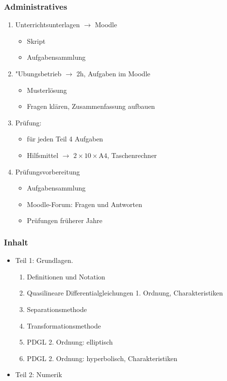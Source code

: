%
%
%
\begin{frame}
\frametitle{Administratives}
\begin{enumerate}
\item Unterrichtsunterlagen $\to$ Moodle
\begin{itemize}
\item Skript
\item Aufgabensammlung
\end{itemize}
\item "Ubungsbetrieb $\to$ 2h, Aufgaben im Moodle
\begin{itemize}
\item Musterlösung
\item Fragen klären, Zusammenfassung aufbauen
\end{itemize}
\item Prüfung:
\begin{itemize}
\item für jeden Teil 4 Aufgaben
\item Hilfsmittel $\to$ $2\times 10\times \text{A4}$, Taschenrechner
\end{itemize}
\item Prüfungsvorbereitung
\begin{itemize}
\item Aufgabensammlung
\item Moodle-Forum: Fragen und Antworten
\item Prüfungen früherer Jahre
\end{itemize}
\end{enumerate}
\end{frame}

\begin{frame}
\frametitle{Inhalt}
\begin{itemize}[<+->]
\item Teil 1: Grundlagen.
\begin{enumerate}[<+->]
\item Definitionen und Notation
\item Quasilineare Differentialgleichungen 1. Ordnung, Charakteristiken
\item Separationsmethode
\item Transformationsmethode
\item PDGL 2. Ordnung: elliptisch
\item PDGL 2. Ordnung: hyperbolisch, Charakteristiken
\end{enumerate}
\item Teil 2: Numerik
\end{itemize}
\end{frame}

